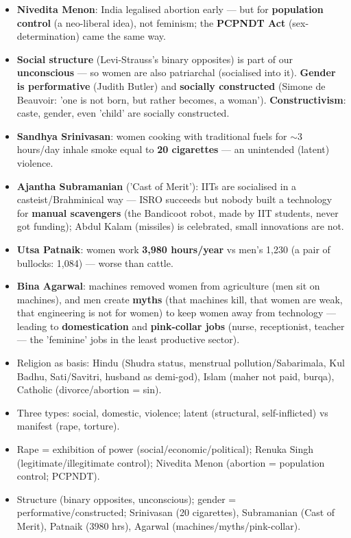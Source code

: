 \begin{KeyConcept}
\begin{itemize}
\item \textbf{Nivedita Menon}: India legalised abortion early --- but for \textbf{population control} (a neo-liberal idea), not feminism; the \textbf{PCPNDT Act} (sex-determination) came the same way.
\end{itemize}
\end{KeyConcept}

\begin{KeyConcept}
\begin{itemize}
\item \textbf{Social structure} (Levi-Strauss's binary opposites) is part of our \textbf{unconscious} --- so women are also patriarchal (socialised into it). \textbf{Gender is performative} (Judith Butler) and \textbf{socially constructed} (Simone de Beauvoir: 'one is not born, but rather becomes, a woman'). \textbf{Constructivism}: caste, gender, even 'child' are socially constructed.
\item \textbf{Sandhya Srinivasan}: women cooking with traditional fuels for $\sim$3 hours/day inhale smoke equal to \textbf{20 cigarettes} --- an unintended (latent) violence.
\item \textbf{Ajantha Subramanian} ('Cast of Merit'): IITs are socialised in a casteist/Brahminical way --- ISRO succeeds but nobody built a technology for \textbf{manual scavengers} (the Bandicoot robot, made by IIT students, never got funding); Abdul Kalam (missiles) is celebrated, small innovations are not.
\item \textbf{Utsa Patnaik}: women work \textbf{3,980 hours/year} vs men's 1,230 (a pair of bullocks: 1,084) --- worse than cattle.
\item \textbf{Bina Agarwal}: machines removed women from agriculture (men sit on machines), and men create \textbf{myths} (that machines kill, that women are weak, that engineering is not for women) to keep women away from technology --- leading to \textbf{domestication} and \textbf{pink-collar jobs} (nurse, receptionist, teacher --- the 'feminine' jobs in the least productive sector).
\end{itemize}
\end{KeyConcept}

\begin{QuickRevision}
\begin{itemize}
\item Religion as basis: Hindu (Shudra status, menstrual pollution/Sabarimala, Kul Badhu, Sati/Savitri, husband as demi-god), Islam (maher not paid, burqa), Catholic (divorce/abortion = sin).
\item Three types: social, domestic, violence; latent (structural, self-inflicted) vs manifest (rape, torture).
\item Rape = exhibition of power (social/economic/political); Renuka Singh (legitimate/illegitimate control); Nivedita Menon (abortion = population control; PCPNDT).
\item Structure (binary opposites, unconscious); gender = performative/constructed; Srinivasan (20 cigarettes), Subramanian (Cast of Merit), Patnaik (3980 hrs), Agarwal (machines/myths/pink-collar).
\end{itemize}
\end{QuickRevision}

